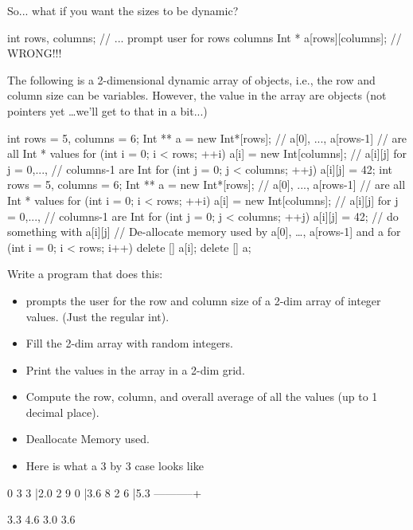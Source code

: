 So... what if you want the sizes to be dynamic?
\begin{console}
int rows, columns;
// ... prompt user for rows columns
Int * a[rows][columns]; // WRONG!!!
\end{console}
The following is a 2-dimensional dynamic array of objects, i.e., the row
and column size can be variables. However, the value in the array are
objects (not pointers yet \ldots we'll get to that in
a bit...)
\begin{console}
int rows = 5, columns = 6;
Int ** a = new Int*[rows]; // a[0], ..., a[rows-1]
                           // are all Int * values
for (int i = 0; i < rows; ++i)
{   
    a[i] = new Int[columns]; // a[i][j] for j = 0,...,
                             // columns-1 are Int
    for (int j = 0; j < columns; ++j)
        a[i][j] = 42;
}
int rows = 5, columns = 6;
Int ** a = new Int*[rows]; // a[0], ..., a[rows-1]
                           // are all Int * values
for (int i = 0; i < rows; ++i)
{   
    a[i] = new Int[columns]; // a[i][j] for j = 0,...,
                             // columns-1 are Int
    for (int j = 0; j < columns; ++j)
        a[i][j] = 42;
}
// do something with a[i][j]
// De-allocate memory used by a[0], \ldots, a[rows-1] and a
for (int i = 0; i < rows; i++)
    delete [] a[i];
delete [] a;
\end{console}
\begin{ex}
Write a program that does this:
\begin{itemize}
\item
  prompts the user for the row and column size of a 2-dim array of
  integer values. (Just the regular int).
\item
  Fill the 2-dim array with random integers.
\item
  Print the values in the array in a 2-dim grid.
\item
  Compute the row, column, and overall average of all the values (up to
  1 decimal place).
\item
  Deallocate Memory used.
\item
  Here is what a 3 by 3 case looks like
\end{itemize}

\begin{console}
0    3   3 |2.0
2    9   0 |3.6
8    2   6 |5.3
-----------+

3.3 4.6 3.0 3.6
\end{console}
\end{ex}

